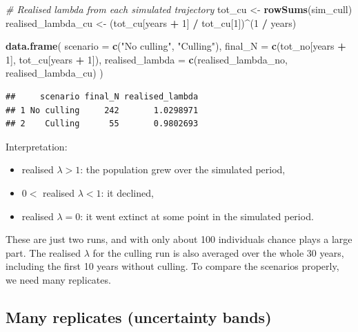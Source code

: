 \documentclass[
  a4paper]{book}
\newenvironment{Shaded}{\begin{snugshade}}{\end{snugshade}}
\newcommand{\AttributeTok}[1]{\textcolor[rgb]{0.13,0.29,0.53}{#1}}
\newcommand{\CommentTok}[1]{\textcolor[rgb]{0.56,0.35,0.01}{\textit{#1}}}
\newcommand{\DecValTok}[1]{\textcolor[rgb]{0.00,0.00,0.81}{#1}}
\newcommand{\FunctionTok}[1]{\textcolor[rgb]{0.13,0.29,0.53}{\textbf{#1}}}
\newcommand{\NormalTok}[1]{#1}
\newcommand{\OtherTok}[1]{\textcolor[rgb]{0.56,0.35,0.01}{#1}}
\newcommand{\SpecialCharTok}[1]{\textcolor[rgb]{0.81,0.36,0.00}{\textbf{#1}}}
\newcommand{\StringTok}[1]{\textcolor[rgb]{0.31,0.60,0.02}{#1}}
\providecommand{\tightlist}{%
  \setlength{\itemsep}{0pt}\setlength{\parskip}{0pt}}
\begin{document}
\begin{Shaded}
\begin{Highlighting}[]
\CommentTok{\# Realised lambda from each simulated trajectory}
\NormalTok{tot\_cu }\OtherTok{\textless{}{-}} \FunctionTok{rowSums}\NormalTok{(sim\_cull)}
\NormalTok{realised\_lambda\_cu }\OtherTok{\textless{}{-}}\NormalTok{ (tot\_cu[years }\SpecialCharTok{+} \DecValTok{1}\NormalTok{] }\SpecialCharTok{/}\NormalTok{ tot\_cu[}\DecValTok{1}\NormalTok{])}\SpecialCharTok{\^{}}\NormalTok{(}\DecValTok{1} \SpecialCharTok{/}\NormalTok{ years)}

\FunctionTok{data.frame}\NormalTok{(}
  \AttributeTok{scenario =} \FunctionTok{c}\NormalTok{(}\StringTok{"No culling"}\NormalTok{, }\StringTok{"Culling"}\NormalTok{),}
  \AttributeTok{final\_N =} \FunctionTok{c}\NormalTok{(tot\_no[years }\SpecialCharTok{+} \DecValTok{1}\NormalTok{], tot\_cu[years }\SpecialCharTok{+} \DecValTok{1}\NormalTok{]),}
  \AttributeTok{realised\_lambda =} \FunctionTok{c}\NormalTok{(realised\_lambda\_no, realised\_lambda\_cu)}
\NormalTok{)}
\end{Highlighting}
\end{Shaded}

\begin{verbatim}
##     scenario final_N realised_lambda
## 1 No culling     242       1.0298971
## 2    Culling      55       0.9802693
\end{verbatim}

Interpretation:

\begin{itemize}
\tightlist
\item
  realised \(\lambda > 1\): the population grew over the simulated period,
\item
  \(0 <\) realised \(\lambda < 1\): it declined,
\item
  realised \(\lambda = 0\): it went extinct at some point in the simulated period.
\end{itemize}

These are just two runs, and with only about 100 individuals chance plays a large part. The realised \(\lambda\) for the culling run is also averaged over the whole 30 years, including the first 10 years without culling. To compare the scenarios properly, we need many replicates.

\subsection{Many replicates (uncertainty bands)}\label{many-replicates-uncertainty-bands}
\end{document}

